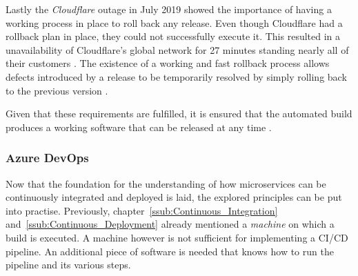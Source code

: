 Lastly the \textit{Cloudflare} outage in July 2019 showed the importance of
having a working process in place to roll back any release. Even though
Cloudflare had a rollback plan in place, they could not successfully execute
it. This resulted in a unavailability of Cloudflare's global network for 27
minutes standing nearly all of their customers
\autocite{Graham-CummingDetailsCloudflareoutage2019}. The existence of a
working and fast rollback process allows defects introduced by a release to be
temporarily resolved by simply rolling back to the previous version
\autocite[p. 199]{MatyasContinuousIntegration2007}.

Given that these requirements are fulfilled, it is ensured that the automated
build produces a working software that can be released at any time \autocite[p.
200]{MatyasContinuousIntegration2007}.

\subsubsection{Azure DevOps}%
\label{ssub:Azure_DevOps}
Now that the foundation for the understanding of how microservices can be
continuously integrated and deployed is laid, the explored principles can be
put into practise. Previously, chapter~\ref{ssub:Continuous_Integration}
and~\ref{ssub:Continuous_Deployment} already mentioned a \textit{machine} on
which a build is executed. A machine however is not sufficient for implementing
a \ac{CI}/\ac{CD} pipeline. An additional piece of software is needed that
knows how to run the pipeline and its various steps.
